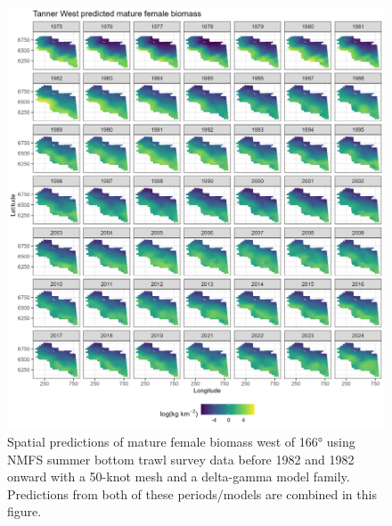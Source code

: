 \documentclass[
]{article}
\begin{document}
\begin{figure}

{\centering \includegraphics[width=1\linewidth,height=1\textheight]{../BAIRDI/Figures/TannerW_matfem_spatbio} 

}

\caption{Spatial predictions of mature female biomass west of 166° using NMFS summer bottom trawl survey data before 1982 and 1982 onward with a 50-knot mesh and a delta-gamma model family. Predictions from both of these periods/models are combined in this figure.}\label{fig:spatpred-bio-50-matfemW}
\end{figure}
\end{document}
